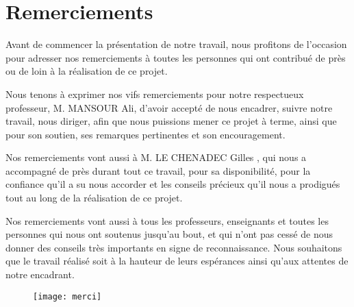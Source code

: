 
\chapter*{Remerciements}

Avant de commencer la présentation de notre travail, nous profitons de l’occasion pour adresser nos remerciements à toutes les personnes qui ont contribué de près ou de loin à la réalisation de ce projet.

Nous tenons à exprimer nos vifs remerciements pour notre respectueux professeur, M. MANSOUR Ali, d’avoir accepté de nous encadrer, suivre notre travail, nous diriger, afin que nous puissions mener ce projet à terme, ainsi que pour son soutien, ses remarques pertinentes et son encouragement.

Nos remerciements vont aussi à M. LE CHENADEC Gilles , qui nous a accompagné de près durant tout ce travail, pour sa disponibilité, pour la confiance qu’il a su nous accorder et les conseils précieux qu’il nous a prodigués tout au long de la réalisation de ce projet.

Nos remerciements vont aussi à tous les professeurs, enseignants et toutes les personnes qui nous ont soutenus jusqu’au bout, et qui n’ont pas cessé de nous donner des conseils très importants en signe de reconnaissance. Nous souhaitons que le travail réalisé soit à la hauteur de leurs espérances ainsi qu’aux attentes de notre encadrant.


\begin{figure}[!h]
  \centering
  \texttt{[image: merci]}
\end{figure}

